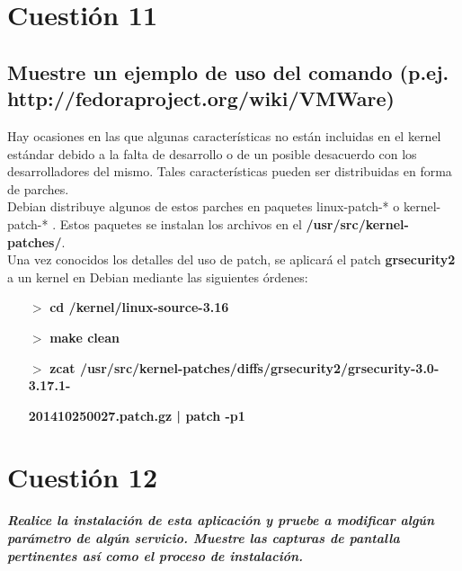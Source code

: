 	
	

\newpage

\section{Cuestión 11}
\subsection{Muestre un ejemplo de uso del comando (p.ej.
http://fedoraproject.org/wiki/VMWare)}

Hay ocasiones en las que algunas características no están incluidas en el kernel estándar debido a la falta de desarrollo o de un posible desacuerdo con los desarrolladores del mismo. Tales características pueden ser distribuidas en forma de parches.
\\

Debian distribuye algunos de estos parches en paquetes linux-patch-* o kernel-patch-* . Estos paquetes se instalan los archivos en el \textbf{/usr/src/kernel-patches/}.
\\

Una vez conocidos los detalles del uso de patch, se aplicará el patch \textbf{grsecurity2} a un kernel en Debian \cite{enlace24} mediante las siguientes órdenes:
\begin{enumerate}
	\item [$>$]  \textbf{cd \AC/kernel/linux-source-3.16}
	\item [$>$] \textbf{make clean}
	\item [$>$] \textbf{zcat /usr/src/kernel-patches/diffs/grsecurity2/grsecurity-3.0-3.17.1-}
	
	\textbf{201410250027.patch.gz | patch -p1}
\end{enumerate}

\newpage

\section{Cuestión 12}
\textbf{\textit{Realice la instalación de esta aplicación y pruebe a modificar
	algún parámetro de algún servicio. Muestre las capturas de pantalla
	pertinentes así como el proceso de instalación.}}

